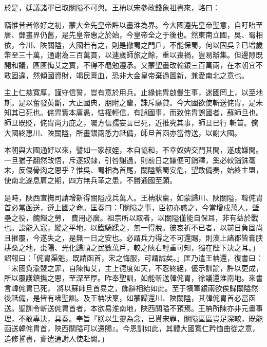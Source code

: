 \begin{pinyinscope}
 於是，廷議諸軍已取關隘不可與。王柟以宋參政錢象祖書來，略曰：



 竊惟昔者修好之初，蒙大金先皇帝許以畫淮為界。今大國遵先皇帝聖意，自盱眙至唐、鄧畫界仍舊，是先皇帝惠之於始，今皇帝全之于後也。然東南立國，吳、蜀相依，今川、陜關隘，大國若有之，則是撤蜀之門戶，不能保蜀，何以固吳？已增歲
 幣至三十萬，通謝為三百萬貫，以連歲師旅之餘，重以喪禍，豈易辦集。但邊隙既開和議，區區悔艾之實，不得不黽勉遵承。又蒙聖畫改輸銀三百萬兩，在本朝宜不敢固違，然傾國資財，竭民膏血，恐非大金皇帝棄過圖新，兼愛南北之意也。



 主上仁慈寬厚，謹守信誓，豈有意於用兵。止緣侂胄啟釁生事，迷國罔上，以至地斯。是以奮發英斷，大正國典，朋附之輩，誅斥靡貸。今大國欲使斬送侂胄，是未知其已死也。侂胄實本庸愚，怙權輕信，有誤國事，而致侂胄誤國者，蘇師旦也。師旦既貶，侂胄尚力庇之，囑方信孺妄言已死，近推究其事，師旦已行
 斬首。儻大國終惠川、陜關隘，所畫銀兩悉力祗備，師旦首函亦當傳送，以謝大國。



 本朝與大國通好以來，譬如一家叔姪，本自協和，不幸奴婢交鬥其間，遂成嫌間。一旦猶子翻然改悟，斥逐奴隸，引咎謝過，則前日之嫌便可銷釋，奚必較錙銖毫末，反傷骨肉之恩乎？惟吳、蜀相為首尾，關隘繫蜀安危，望敢備奏，始終主盟，使南北遂息肩之期，四方無兵革之患，不勝通國至願。



 是時，陜西宣撫司請增新得關隘戍兵萬人。王柟狀稟，如蒙歸川、陜關隘，韓侂胄首必當函送，遵上國之命。匡奏曰：「關隘之事，臣初亦惑之，今當增戍萬人，壁壘之役，餽餫之勞，
 費用必廣。祖宗所以取者，以關隘僅能自保耳，非有益於戰也。設能入寇，縱之平地，以鐵騎蹂之，無一得脫。彼哀祈不已者，以前日負固尚且摧覆，今遂失之，是無一日之安也。必謂兵力得之不可還賜，則漢上諸郡皆膏腴耕桑之地，棗陽、光化歸順之民數萬戶，較之陜右輕重可知，獨在陛下決之耳。」詔報曰：「侂胄渠魁，既請函首，宋之悔服，可謂誠矣。」匡乃遣王柟還，復書曰：「宋國負渝盟之罪，自陳悔艾，主上德度如天，不忍終絕，優示訓諭，許以更成，所以覆護鎮撫之恩，至深至厚。昨奉聖訓，如能斬送韓侂胄，徐議還淮南地。來書言韓侂胄已死，
 將以蘇師旦首易之，飾辭相紿如此。至于犒軍銀兩欲俟歸關隘然後祗備，是皆有咈聖訓。及王柟狀稟，如蒙歸還川、陜關隘，其韓侂胄首必當函送。聖訓令斬送侂胄首者，本欲易淮南地，陜西關隘不預焉。王柟所陳亦非元畫事理，不敢專決，具奏。奉旨『朕以生靈為念，已貰宋罪，關隘區區豈足深較，既能函送韓侂胄首，陜西關隘可以還賜』。今恩訓如此，其體大國寬仁矜恤曲從之意，追修誓書，齎遣通謝人使赴闕。」




\end{pinyinscope}
